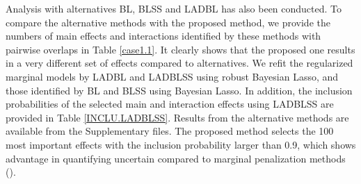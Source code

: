 \documentclass[12pt]{article}
\begin{document}
Analysis with alternatives BL, BLSS and LADBL has also been conducted. To compare the alternative methods with the proposed method, we provide the numbers of main effects and interactions identified by these methods with pairwise overlaps in Table \ref{case1.1}. It clearly shows that the proposed one results in a very different set of effects compared to alternatives. We refit the regularized marginal models by LADBL and LADBLSS using robust Bayesian Lasso, and those identified by BL and BLSS using Bayesian Lasso. In addition, the inclusion probabilities of the selected main and interaction effects using LADBLSS are provided in Table \ref{INCLU.LADBLSS}. Results from the alternative methods are available from the Supplementary files. The proposed method selects the 100 most important effects with the inclusion probability larger than 0.9, which shows advantage in quantifying uncertain compared to marginal penalization methods (\cite{SLH,CZJ,ZSX}).


\begin{table} [ht!]
\def\arraystretch{1.7}
\begin{center}
\caption{The numbers of main G effects and interactions identified by different approaches and their overlaps.}\label{case1.1}
\centering
\fontsize{10}{10}
\end{center}
\centering
\end{table}
\end{document}
